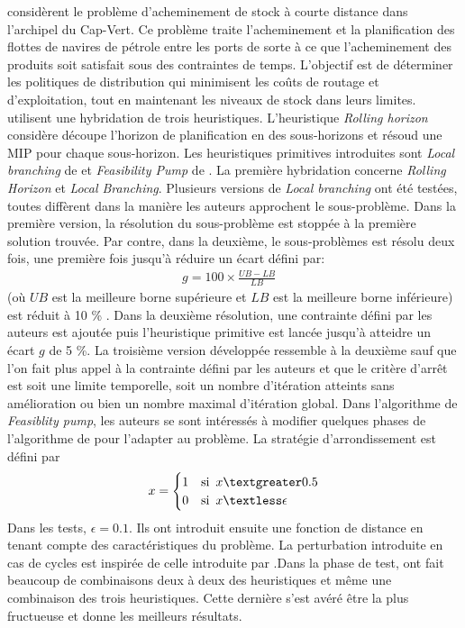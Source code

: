\documentclass[12pt,a4paper,oneside]{book}
\theoremstyle{definition}
\begin{document}
	    \cite{Agra2014} considèrent le problème d'acheminement de stock à courte distance dans l'archipel du Cap-Vert. Ce problème traite l'acheminement et la planification des flottes de navires de pétrole entre les ports de sorte à ce que l'acheminement des produits soit satisfait sous des contraintes de temps. L'objectif est de déterminer les politiques de distribution qui minimisent les coûts de routage et d'exploitation, tout en maintenant les niveaux de stock dans leurs limites. \cite{Agra2014} utilisent une hybridation de trois heuristiques. L'heuristique \textit{Rolling horizon} considère découpe l'horizon de planification en des sous-horizons et résoud une MIP pour chaque sous-horizon. Les heuristiques primitives introduites sont \textit{Local branching} de \cite{fischetti2003local} et \textit{Feasibility Pump}  de \cite{Fischetti2005}. La première hybridation concerne \textit{Rolling Horizon} et \textit{Local Branching}. Plusieurs versions de \textit{Local branching} ont été testées, toutes diffèrent dans la manière les auteurs approchent le sous-problème. Dans la première version, la résolution du sous-problème est stoppée à la première solution trouvée. Par contre, dans la deuxième, le sous-problèmes est résolu deux fois, une première fois jusqu'à réduire un écart défini par: 
	    \begin{gather} \label{gap}
	        g = 100 \times \frac{UB-LB}{LB} \hspace{10pt}
	    \end{gather}
	    (où $UB$ est la meilleure borne supérieure et $LB$ est la meilleure borne inférieure)    
	     est réduit à 10 \% . Dans la  deuxième résolution, une contrainte défini par les auteurs est ajoutée puis l'heuristique primitive est lancée jusqu'à atteidre un écart $g$ de 5 \%. La troisième version développée ressemble à la deuxième sauf que l'on fait plus appel à la contrainte défini par les auteurs et que le critère d'arrêt est soit une limite temporelle, soit un nombre d'itération atteints sans amélioration ou bien un nombre maximal d'itération global.
	    Dans l'algorithme de \textit{Feasiblity pump}, les auteurs se sont intéressés à modifier quelques phases de l'algorithme de \cite{Fischetti2005} pour l'adapter au problème. La stratégie d'arrondissement est défini par 
	    \begin{gather}
	        x = \begin{cases}
	            1  & \text{si} \hspace{5pt} x \textgreater 0.5 \\
	            0 & \text{si} \hspace{5pt} x \textless \epsilon
	        \end{cases}
	    \end{gather}
	    Dans les tests, $\epsilon = 0.1$.
	    Ils ont introduit ensuite une fonction de distance en tenant compte des caractéristiques du problème. La perturbation introduite en cas de cycles est inspirée de celle introduite par \cite{Achterberg2007}.Dans la phase de test, \cite{Agra2014} ont fait beaucoup de combinaisons deux à deux des heuristiques et même une combinaison des trois heuristiques. Cette dernière s'est avéré être la plus fructueuse et donne les meilleurs résultats.
	  
\end{document}
